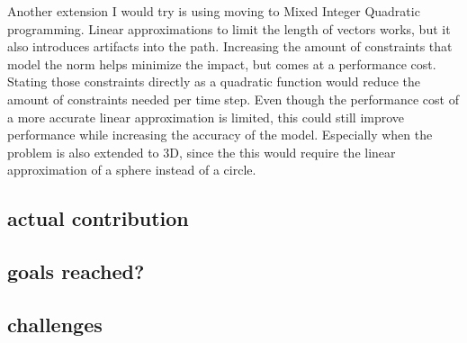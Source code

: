 Another extension I would try is using moving to Mixed Integer Quadratic programming. Linear approximations to limit the length of vectors works, but it also introduces artifacts into the path. Increasing the amount of constraints that model the norm helps minimize the impact, but comes at a performance cost. Stating those constraints directly as a quadratic function would reduce the amount of constraints needed per time step. Even though the performance cost of a more accurate linear approximation is limited, this could still improve performance while increasing the accuracy of the model. Especially when the problem is also extended to 3D, since the this would require the linear approximation of a sphere instead of a circle. \\

\subsection{actual contribution}
\subsection{goals reached?}


\subsection{challenges}